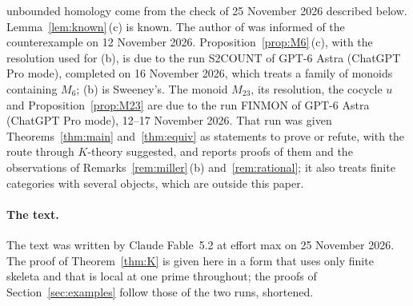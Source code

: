 \documentclass[11pt,a4paper]{article}
\theoremstyle{definition}
\begin{document}
unbounded homology come from the check of 25 November 2026 described below.
Lemma~\ref{lem:known}\,(c) is known. The author of \cite{BB} was informed of
the counterexample on 12 November 2026.
Proposition~\ref{prop:M6}\,(c), with the resolution used for (b), is due to
the run S2COUNT of GPT-6 Astra (ChatGPT Pro mode), completed on 16 November
2026, which treats a family of monoids containing $M_6$; (b) is Sweeney's.
The monoid $M_{23}$, its resolution, the cocycle $u$ and
Proposition~\ref{prop:M23} are due to the run FINMON of GPT-6 Astra
(ChatGPT Pro mode), 12--17 November 2026. That run was given
Theorems~\ref{thm:main} and~\ref{thm:equiv} as statements to prove or
refute, with the route through $K$-theory suggested, and reports proofs of
them and the observations of Remarks~\ref{rem:miller}\,(b)
and~\ref{rem:rational}; it also treats finite categories with several
objects, which are outside this paper.

\paragraph{The text.} The text was written by Claude Fable~5.2 at effort
max on 25 November 2026. The proof of Theorem~\ref{thm:K} is given here in a
form that uses only finite skeleta and that is local at one prime
throughout; the proofs of Section~\ref{sec:examples} follow those of the two
runs, shortened.
\end{document}
